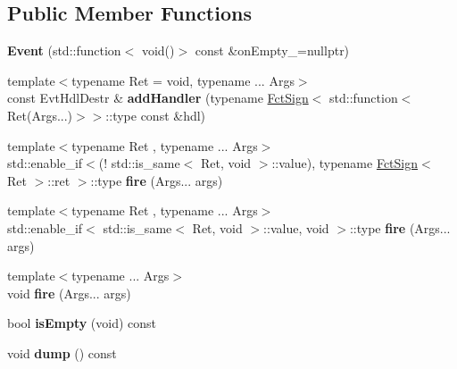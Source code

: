 \subsection*{Public Member Functions}
\begin{DoxyCompactItemize}
\item 
\mbox{\label{classzany_1_1evt_1_1_event_a013618651040ecea7c55538bea0c65e8}} 
{\bfseries Event} (std\+::function$<$ void()$>$ const \&on\+Empty\+\_\+=nullptr)
\item 
\mbox{\label{classzany_1_1evt_1_1_event_a9844354cb161b041af9c9d3830eea36b}} 
{\footnotesize template$<$typename Ret  = void, typename ... Args$>$ }\\const Evt\+Hdl\+Destr \& {\bfseries add\+Handler} (typename \hyperlink{structzany_1_1evt_1_1_event_1_1_fct_sign}{Fct\+Sign}$<$ std\+::function$<$ Ret(Args...)$>$$>$\+::type const \&hdl)
\item 
\mbox{\label{classzany_1_1evt_1_1_event_a24f9a27694cc913ae25895f27b54839a}} 
{\footnotesize template$<$typename Ret , typename ... Args$>$ }\\std\+::enable\+\_\+if$<$(! std\+::is\+\_\+same$<$ Ret, void $>$\+::value), typename \hyperlink{structzany_1_1evt_1_1_event_1_1_fct_sign}{Fct\+Sign}$<$ Ret $>$\+::ret $>$\+::type {\bfseries fire} (Args... args)
\item 
\mbox{\label{classzany_1_1evt_1_1_event_ad293c2395cbe9bcfab7b1543503d0aea}} 
{\footnotesize template$<$typename Ret , typename ... Args$>$ }\\std\+::enable\+\_\+if$<$ std\+::is\+\_\+same$<$ Ret, void $>$\+::value, void $>$\+::type {\bfseries fire} (Args... args)
\item 
\mbox{\label{classzany_1_1evt_1_1_event_ae221767af6e994276f4fd65d19b55c12}} 
{\footnotesize template$<$typename ... Args$>$ }\\void {\bfseries fire} (Args... args)
\item 
\mbox{\label{classzany_1_1evt_1_1_event_a3453343dcc64fc4be93e968f40dbadb7}} 
bool {\bfseries is\+Empty} (void) const
\item 
\mbox{\label{classzany_1_1evt_1_1_event_ab95d3e01e1c5c11439a1bf6a87bfb31b}} 
void {\bfseries dump} () const
\end{DoxyCompactItemize}
